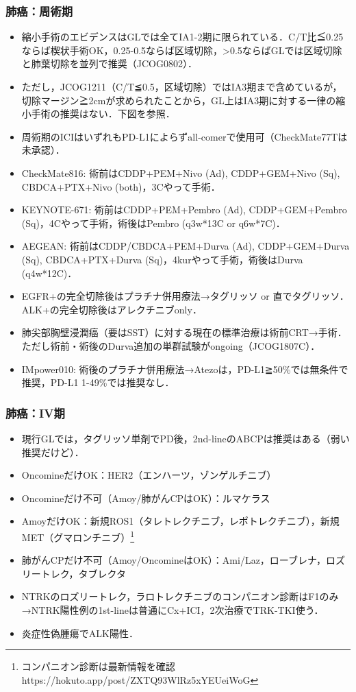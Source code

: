 \subsubsection{肺癌：周術期}

\begin{itemize}
\item 縮小手術のエビデンスはGLでは全てIA1-2期に限られている．C/T比≦0.25ならば楔状手術OK，0.25-0.5ならば区域切除，>0.5ならばGLでは区域切除と肺葉切除を並列で推奨（JCOG0802）．
\item ただし，JCOG1211（C/T≦0.5，区域切除）ではIA3期まで含めているが，切除マージン≧2cmが求められたことから，GL上はIA3期に対する一律の縮小手術の推奨はない．下図を参照．


\item 周術期のICIはいずれもPD-L1によらずall-comerで使用可（CheckMate77Tは未承認）．
\item CheckMate816: 術前はCDDP+PEM+Nivo (Ad), CDDP+GEM+Nivo (Sq), CBDCA+PTX+Nivo (both)，3Cやって手術．
\item KEYNOTE-671: 術前はCDDP+PEM+Pembro (Ad), CDDP+GEM+Pembro (Sq)，4Cやって手術，術後はPembro (q3w*13C or q6w*7C)．
\item AEGEAN: 術前はCDDP/CBDCA+PEM+Durva (Ad), CDDP+GEM+Durva (Sq), CBDCA+PTX+Durva (Sq)，4kurやって手術，術後はDurva (q4w*12C)．
\item EGFR+の完全切除後はプラチナ併用療法→タグリッソ or 直でタグリッソ．ALK+の完全切除後はアレクチニブonly．
\item 肺尖部胸壁浸潤癌（要はSST）に対する現在の標準治療は術前CRT→手術．ただし術前・術後のDurva追加の単群試験がongoing（JCOG1807C）．
\item IMpower010: 術後のプラチナ併用療法→Atezoは，PD-L1≧50\%では無条件で推奨，PD-L1 1-49\%では推奨なし．
\end{itemize}


\subsubsection{肺癌：IV期}

\begin{itemize}
\item 現行GLでは，タグリッソ単剤でPD後，2nd-lineのABCPは推奨はある（弱い推奨だけど）．
\item OncomineだけOK：HER2（エンハーツ，ゾンゲルチニブ）
\item Oncomineだけ不可（Amoy/肺がんCPはOK）：ルマケラス
\item AmoyだけOK：新規ROS1（タレトレクチニブ，レポトレクチニブ），新規MET（グマロンチニブ）\footnote{コンパニオン診断は最新情報を確認 https://hokuto.app/post/ZXTQ93WlRz5xYEUeiWoG}
\item 肺がんCPだけ不可（Amoy/OncomineはOK）：Ami/Laz，ローブレナ，ロズリートレク，タブレクタ
\item NTRKのロズリートレク，ラロトレクチニブのコンパニオン診断はF1のみ→NTRK陽性例の1st-lineは普通にCx+ICI，2次治療でTRK-TKI使う．
\item 炎症性偽腫瘍でALK陽性．
\end{itemize}



